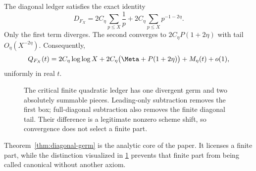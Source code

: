 \begin{theorem}
\label{thm:diagonal-germ}
The diagonal ledger satisfies the exact identity
\begin{equation}
 D_{F_X}
 =2C_\eta\sum_{p\le X}\frac1p
 +2C_\eta\sum_{p\le X}p^{-1-2\eta}.
 \label{eq:diagonal-decomposition}
\end{equation}
Only the first term diverges.  The second converges to
$2C_\eta P(1+2\eta)$ with tail $O_\eta(X^{-2\eta})$.
Consequently,
\begin{equation}
 Q_{F_X}(t)=2C_\eta\log\log X
 +2C_\eta\bigl(\Meta+P(1+2\eta)\bigr)
 +M_\eta(t)+o(1),
 \label{eq:sharp-asymptotic}
\end{equation}
uniformly in real $t$.
\end{theorem}

\begin{figure}[t]
\centering

\caption{The critical finite quadratic ledger has one divergent germ and two
absolutely summable pieces.  Leading-only subtraction removes the first box;
full-diagonal subtraction also removes the finite diagonal tail.  Their
difference is a legitimate nonzero scheme shift, so convergence does not
select a finite part.}
\label{fig:quadratic-decomposition}
\end{figure}

Theorem~\ref{thm:diagonal-germ} is the analytic core of the paper.  It licenses
a finite part, while the distinction visualized in
\cref{fig:quadratic-decomposition} prevents that finite part from being called
canonical without another axiom.
